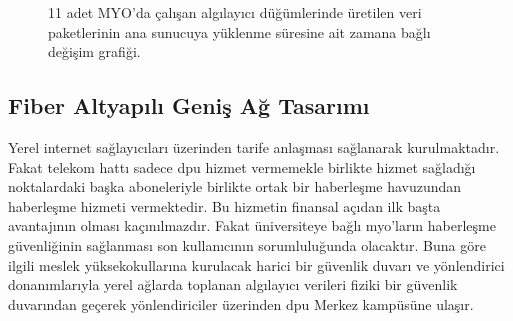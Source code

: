 \begin{figure}[htbp]
\centering



\caption{11 adet MYO'da çalışan algılayıcı düğümlerinde üretilen veri paketlerinin ana sunucuya yüklenme süresine ait zamana bağlı değişim grafiği.}
\label{fig:4-38}
\end{figure}

\newpage
\subsection{Fiber Altyapılı Geniş Ağ Tasarımı}\label{fibeeraciklama}


Yerel internet sağlayıcıları üzerinden tarife anlaşması sağlanarak kurulmaktadır. Fakat telekom hattı sadece \gls{dpu} hizmet vermemekle birlikte hizmet sağladığı noktalardaki başka aboneleriyle birlikte ortak bir haberleşme havuzundan haberleşme hizmeti vermektedir. Bu hizmetin finansal açıdan ilk başta avantajının olması kaçınılmazdır. Fakat üniversiteye bağlı \gls{myo}'ların haberleşme güvenliğinin sağlanması son kullanıcının sorumluluğunda olacaktır. Buna göre ilgili meslek yüksekokullarına kurulacak harici bir güvenlik duvarı ve yönlendirici donanımlarıyla yerel ağlarda toplanan algılayıcı verileri fiziki bir güvenlik duvarından geçerek yönlendiriciler üzerinden \gls{dpu} Merkez kampüsüne ulaşır.


